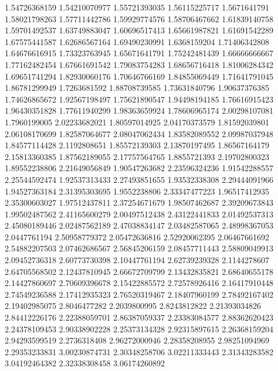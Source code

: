   1.54726368159    1.54210070977
  1.55721393035    1.56115225717
   1.5671641791    1.58021798263
  1.57711442786    1.59929774576
  1.58706467662    1.61839140758
  1.59701492537    1.63749883047
  1.60696517413    1.65661987821
  1.61691542289    1.67575441587
  1.62686567164    1.69490230991
   1.6368159204    1.71406342808
  1.64676616915    1.73323763945
  1.65671641791    1.75242481439
  1.66666666667    1.77162482454
  1.67661691542    1.79083754283
  1.68656716418    1.81006284342
  1.69651741294    1.82930060176
  1.70646766169    1.84855069449
  1.71641791045    1.86781299949
   1.7263681592    1.88708739585
  1.73631840796    1.90637376385
  1.74626865672    1.92567198497
  1.75621890547    1.94498194185
  1.76616915423    1.96430351828
  1.77611940299    1.98363659924
  1.78606965174    2.00298107081
   1.7960199005    2.02233682021
  1.80597014925    2.04170373579
  1.81592039801    2.06108170699
  1.82587064677    2.08047062434
  1.83582089552    2.09987037948
  1.84577114428     2.1192808651
  1.85572139303    2.13870197495
  1.86567164179    2.15813360385
  1.87562189055    2.17757564765
   1.8855721393    2.19702800323
  1.89552238806    2.21649056849
  1.90547263682    2.23596324236
  1.91542288557    2.25544592474
  1.92537313433    2.27493851655
  1.93532338308    2.29444091966
  1.94527363184    2.31395303695
   1.9552238806    2.33347477223
  1.96517412935    2.35300603027
  1.97512437811    2.37254671679
  1.98507462687    2.39209673843
  1.99502487562    2.41165600279
  2.00497512438    2.43122441833
  2.01492537313    2.45080189446
  2.02487562189    2.47038834147
  2.03482587065    2.48998367053
   2.0447761194    2.50958779372
  2.05472636816    2.52920062395
  2.06467661692    2.54882207503
  2.07462686567    2.56845206159
  2.08457711443    2.58809049913
  2.09452736318    2.60773730398
  2.10447761194    2.62739239328
   2.1144278607    2.64705568502
  2.12437810945    2.66672709799
  2.13432835821    2.68640655178
  2.14427860697    2.70609396678
  2.15422885572    2.72578926416
  2.16417910448    2.74549236588
  2.17412935323    2.76520319467
  2.18407960199    2.78492167402
  2.19402985075     2.8046477282
   2.2039800995     2.8243812822
  2.21393034826    2.84412226176
  2.22388059701    2.86387059337
  2.23383084577    2.88362620423
  2.24378109453    2.90338902228
  2.25373134328    2.92315897615
  2.26368159204    2.94293599519
   2.2736318408    2.96272000946
  2.28358208955    2.98251094969
  2.29353233831    3.00230874731
  2.30348258706    3.02211333443
  2.31343283582    3.04192464382
  2.32338308458    3.06174260892
